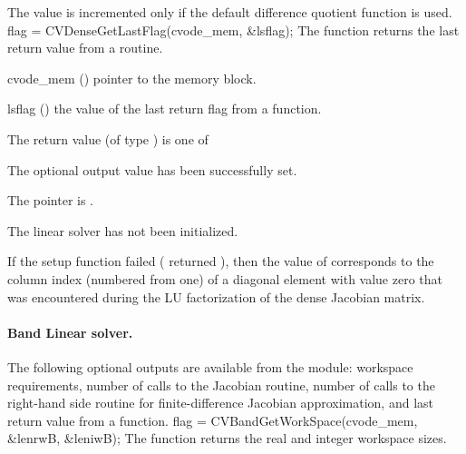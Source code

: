 {
  The value  is incremented only if the default 
   difference quotient function is used.
}
{
  flag = CVDenseGetLastFlag(cvode\_mem, \&lsflag);
}
{
  The function  returns the
  last return value from a {\cvdense} routine. 
}
{
  \begin{args}
  \item[cvode\_mem] ()
    pointer to the {\cvodes} memory block.
  \item[lsflag] ()
    the value of the last return flag from a {\cvdense} function.
  \end{args}
}
{
  The return value  (of type ) is one of
  \begin{args}
  \item[\Id{CVDENSE\_SUCCESS}] 
    The optional output value has been successfully set.
  \item[\Id{CVDENSE\_MEM\_NULL}]
    The  pointer is .
  \item[\Id{CVDENSE\_LMEM\_NULL}]
    The {\cvdense} linear solver has not been initialized.
  \end{args}
}
{
  If the {\cvdense} setup function failed ( returned ),
  then the value of  corresponds to the column index (numbered from one) of
  a diagonal element with value zero that was encountered during the LU factorization of the 
  dense Jacobian matrix.
}
%
%
\noindent\paragraph{\bf Band Linear solver.}
The following optional outputs are available from the {\cvband} module:
workspace requirements, number of calls to the Jacobian routine, number of 
calls to the right-hand side routine for finite-difference Jacobian approximation,
and last return value from a {\cvband} function.
{
  flag = CVBandGetWorkSpace(cvode\_mem, \&lenrwB, \&leniwB);
}
{
  The function  returns the
  {\cvband} real and integer workspace sizes.
}
